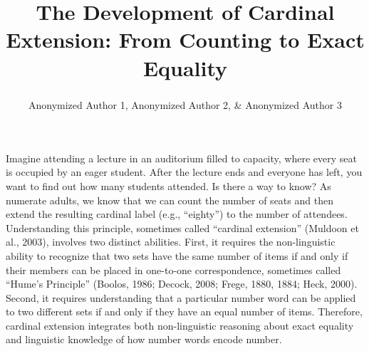\documentclass[
  man,floatsintext]{apa7}
\title{The Development of Cardinal Extension: From Counting to Exact Equality}
\author{Anonymized Author 1\textsuperscript{}, Anonymized Author 2\textsuperscript{}, \& Anonymized Author 3\textsuperscript{}}
\date{}
\affiliation{\vspace{0.5cm}\textsuperscript{} {[}anonymized{]}}
\begin{document}
\maketitle

Imagine attending a lecture in an auditorium filled to capacity, where every seat is occupied by an eager student. After the lecture ends and everyone has left, you want to find out how many students attended. Is there a way to know? As numerate adults, we know that we can count the number of seats and then extend the resulting cardinal label (e.g., ``eighty'') to the number of attendees. Understanding this principle, sometimes called ``cardinal extension'' (Muldoon et al., 2003), involves two distinct abilities. First, it requires the non-linguistic ability to recognize that two sets have the same number of items if and only if their members can be placed in one-to-one correspondence, sometimes called ``Hume's Principle'' (Boolos, 1986; Decock, 2008; Frege, 1880, 1884; Heck, 2000). Second, it requires understanding that a particular number word can be applied to two different sets if and only if they have an equal number of items. Therefore, cardinal extension integrates both non-linguistic reasoning about exact equality and linguistic knowledge of how number words encode number.
\end{document}

